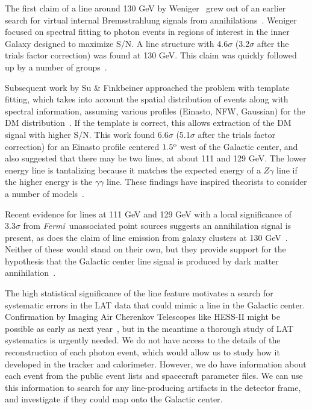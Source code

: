 \documentclass[aps,twocolumn,prd,superscriptaddress,showpacs,nofootinbib,fixfloat]{revtex4}
\newcommand{\Fermi}{{\slshape Fermi}}
\newcommand{\degree}{^{\rm o}}
\begin{document}
The first claim of a line around 130 GeV by
Weniger~\citep{Weniger:2012} grew out of an earlier search
for virtual internal Bremsstrahlung signals from
annihilations~\citep{Bringmann:2012}.  Weniger focused on
spectral fitting to photon events in regions of interest in
the inner Galaxy designed to maximize S/N.  A line structure
with 4.6$\sigma$ (3.2$\sigma$ after the trials factor
correction) was found at 130 GeV. 
This claim was quickly followed up by a number of groups~\cite{tempel:2012ey,
Boyarsky:2012ca}.

Subsequent work by Su \& Finkbeiner approached the problem
with template fitting, which takes into account the spatial
distribution of events along with spectral information,
assuming various profiles (Einasto, NFW, Gaussian) for the
DM distribution~\citep{linepaper}.  If the template is
correct, this allows extraction of the DM signal with
higher S/N.  This work found 6.6$\sigma$ (5.1$\sigma$ after
the trials factor correction) for an Einasto profile
centered $1.5\degree$ west of the Galactic center, and also
suggested that there may be two lines, at about 111 and 129
GeV.  The lower energy line is tantalizing because it
matches the expected energy of a $Z\gamma$ line if the
higher energy is the $\gamma\gamma$ line.  These findings
have inspired theorists to consider a number of models~\citep{Dudas:2012, Choi:2012,
Kyae:2012, Lee:2012, Rajaraman:2012, Acharya:2012,
Garny:2012, Buckley:2012, Chu:2012, Kang:2012,
Buchmuller:2012, Heo:2012, Park:2012, Tulin:2012,
Cline:2012, Weiner:2012}.

Recent evidence for lines at 111 GeV and 129 GeV with a
local significance of $3.3\sigma$ from \Fermi\ unassociated
point sources suggests an annihilation signal is present, as
does the claim of line emission from galaxy clusters at 130
GeV~\cite{Hektor:2012kc}.  Neither of these would stand on
their own, but they provide support for the hypothesis that
the Galactic center line signal is produced by dark matter
annihilation~\cite{doubleline}.

The high statistical significance of the line
feature motivates a search for systematic errors in the
LAT data that could mimic a line in the Galactic center.
Confirmation by Imaging Air Cherenkov Telescopes like HESS-II might be
possible as early as next
year~\cite{Bergstrom:2012}, but in the meantime a thorough
study of LAT systematics is urgently needed.  We do not have
access to the details of the reconstruction of each photon
event, which would allow us to study how it developed in the
tracker and calorimeter.  However, we do have information
about each event from the public event lists and spacecraft
parameter files.  We can use this information to search for
any line-producing artifacts in the detector frame, and
investigate if they could map onto the Galactic center.
\end{document}
